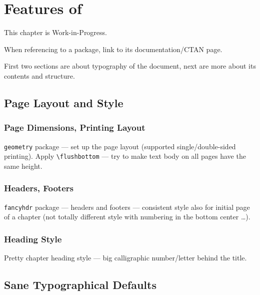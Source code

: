 \chapter{Features of \TeXtured{}} \label{ch:Features}

\begin{Note}
    This chapter is Work-in-Progress.
\end{Note}
\begin{Todo}
    When referencing to a package, link to its documentation/CTAN page.
\end{Todo}

First two sections are about typography of the document, next are more about its contents and structure.

\section{Page Layout and Style}%
\label{sec:Page Layout}

\subsection{Page Dimensions, Printing Layout}%
\label{sub:Page Dimensions}

\texttt{geometry} package --- set up the page layout (supported single/double-sided printing).
Apply \verb|\flushbottom| --- try to make text body on all pages have the same height.

\subsection{Headers, Footers}%
\label{sub:Headers Footers}

\texttt{fancyhdr} package --- headers and footers --- consistent style also for initial page of a chapter (not totally different style with numbering in the bottom center \ldots).

\subsection{Heading Style}%
\label{sub:Heading Style}

Pretty chapter heading style --- big calligraphic number/letter behind the title.


\section{Sane Typographical Defaults}%
\label{sec:Sane Typographical Defaults}

